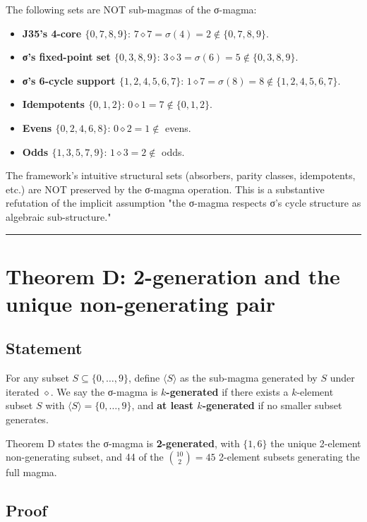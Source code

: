 \documentclass[11pt,reqno]{amsart}
\theoremstyle{plain}
\theoremstyle{definition}
\begin{document}
The following sets are NOT sub-magmas of the σ-magma:

\begin{itemize}
\item \textbf{J35's 4-core $\{0, 7, 8, 9\}$}: $7 \diamond 7 = \sigma(4) = 2 \notin \{0, 7, 8, 9\}$.
\item \textbf{σ's fixed-point set $\{0, 3, 8, 9\}$}: $3 \diamond 3 = \sigma(6) = 5 \notin \{0, 3, 8, 9\}$.
\item \textbf{σ's 6-cycle support $\{1, 2, 4, 5, 6, 7\}$}: $1 \diamond 7 = \sigma(8) = 8 \notin \{1, 2, 4, 5, 6, 7\}$.
\item \textbf{Idempotents $\{0, 1, 2\}$}: $0 \diamond 1 = 7 \notin \{0, 1, 2\}$.
\item \textbf{Evens $\{0, 2, 4, 6, 8\}$}: $0 \diamond 2 = 1 \notin$ evens.
\item \textbf{Odds $\{1, 3, 5, 7, 9\}$}: $1 \diamond 3 = 2 \notin$ odds.
\end{itemize}

The framework's intuitive structural sets (absorbers, parity classes, idempotents, etc.) are NOT preserved by the σ-magma operation. This is a substantive refutation of the implicit assumption "the σ-magma respects σ's cycle structure as algebraic sub-structure."

\medskip\hrule\medskip

\section{Theorem D: 2-generation and the unique non-generating pair}

\subsection{Statement}

For any subset $S \subseteq \{0, \ldots, 9\}$, define $\langle S \rangle$ as the sub-magma generated by $S$ under iterated $\diamond$. We say the σ-magma is \textbf{$k$-generated} if there exists a $k$-element subset $S$ with $\langle S \rangle = \{0, \ldots, 9\}$, and \textbf{at least $k$-generated} if no smaller subset generates.

Theorem D states the σ-magma is \textbf{2-generated}, with $\{1, 6\}$ the unique 2-element non-generating subset, and 44 of the $\binom{10}{2} = 45$ 2-element subsets generating the full magma.

\subsection{Proof}
\end{document}
